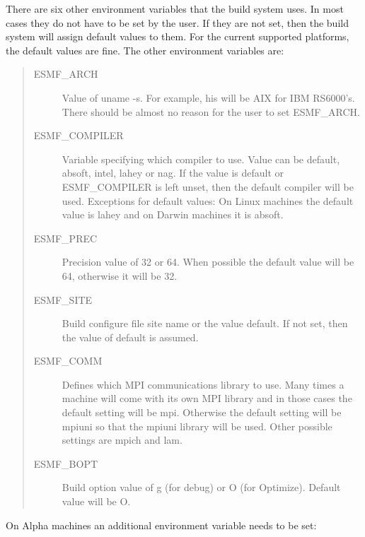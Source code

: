 There are six other environment variables that the build system uses.
In most cases they do not have to be set by the user.  If they are not
set, then the build system will assign default values to them.  For the
current supported platforms, the default values are fine.  The other
environment variables are:
\begin{quote}
\begin{description}

  \item[ESMF\_ARCH] Value of uname -s.  For example, his will be AIX for IBM
                 RS6000's.  There should be almost no reason for the
                 user to set ESMF\_ARCH.

  \item[ESMF\_COMPILER] Variable specifying which compiler to use.  Value
                   can be default, absoft, intel, lahey or nag. 
                   If the value is default or ESMF\_COMPILER is 
                   left unset, then the default compiler 
                   will be used.  Exceptions for default values:  
                   On Linux machines the default value 
                   is lahey and on Darwin machines it is absoft.

  \item[ESMF\_PREC] Precision value of 32 or 64.  When possible the
                 default value will be 64, otherwise it will be 32.


  \item[ESMF\_SITE] Build configure file site name or the value
                 default.  If not set, then the value of default is
                 assumed.

  \item[ESMF\_COMM] Defines which MPI communications library to use.  
                   Many times a machine will come with its own MPI 
                   library and in those cases the default setting 
                   will be mpi.  Otherwise the default setting will be 
                   mpiuni so that the mpiuni library will be used.
                   Other possible settings are mpich and lam.

  \item[ESMF\_BOPT] Build option value of g (for debug) or O (for
                 Optimize).  Default value will be O.

\end{description}
\end{quote}

On Alpha machines an additional environment variable needs
to be set:

